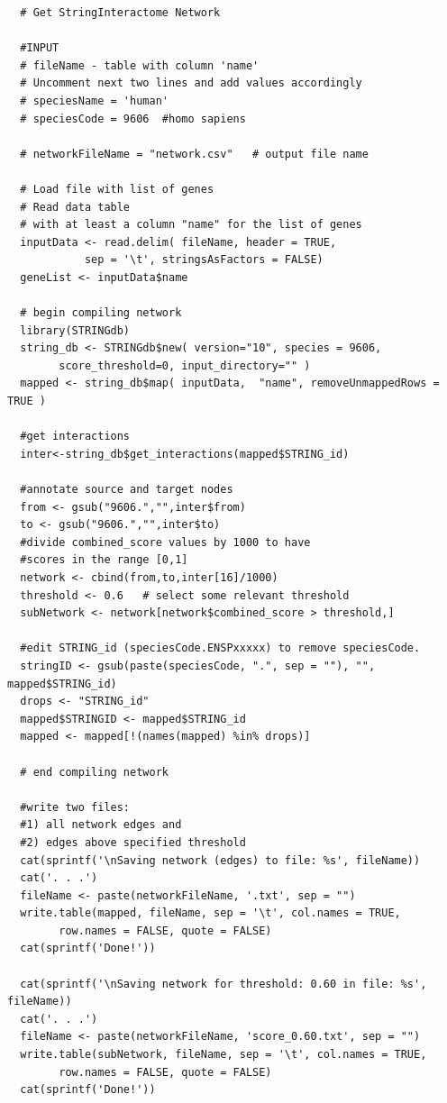 \documentclass[11pt, oneside]{article}   	%
\begin{document}
\begin{framed}
\begin{verbatim}
  # Get StringInteractome Network 
  
  #INPUT 
  # fileName - table with column 'name'
  # Uncomment next two lines and add values accordingly
  # speciesName = 'human'
  # speciesCode = 9606  #homo sapiens
  
  # networkFileName = "network.csv"   # output file name

  # Load file with list of genes  
  # Read data table
  # with at least a column "name" for the list of genes
  inputData <- read.delim( fileName, header = TRUE, 
      		sep = '\t', stringsAsFactors = FALSE)
  geneList <- inputData$name
  
  # begin compiling network
  library(STRINGdb)
  string_db <- STRINGdb$new( version="10", species = 9606, 
  		score_threshold=0, input_directory="" )
  mapped <- string_db$map( inputData,  "name", removeUnmappedRows = TRUE )
  
  #get interactions 
  inter<-string_db$get_interactions(mapped$STRING_id)
  
  #annotate source and target nodes
  from <- gsub("9606.","",inter$from)
  to <- gsub("9606.","",inter$to)
  #divide combined_score values by 1000 to have
  #scores in the range [0,1]
  network <- cbind(from,to,inter[16]/1000)  
  threshold <- 0.6   # select some relevant threshold
  subNetwork <- network[network$combined_score > threshold,] 
  
  #edit STRING_id (speciesCode.ENSPxxxxx) to remove speciesCode.
  stringID <- gsub(paste(speciesCode, ".", sep = ""), "", mapped$STRING_id)
  drops <- "STRING_id"
  mapped$STRINGID <- mapped$STRING_id
  mapped <- mapped[!(names(mapped) %in% drops)]
  
  # end compiling network
  
  #write two files: 
  #1) all network edges and 
  #2) edges above specified threshold
  cat(sprintf('\nSaving network (edges) to file: %s', fileName))
  cat('. . .')
  fileName <- paste(networkFileName, '.txt', sep = "")
  write.table(mapped, fileName, sep = '\t', col.names = TRUE, 
  		row.names = FALSE, quote = FALSE)
  cat(sprintf('Done!'))
  
  cat(sprintf('\nSaving network for threshold: 0.60 in file: %s', fileName))
  cat('. . .')
  fileName <- paste(networkFileName, 'score_0.60.txt', sep = "")
  write.table(subNetwork, fileName, sep = '\t', col.names = TRUE, 
  		row.names = FALSE, quote = FALSE)
  cat(sprintf('Done!'))
\end{verbatim}
\end{framed}
\end{document}
